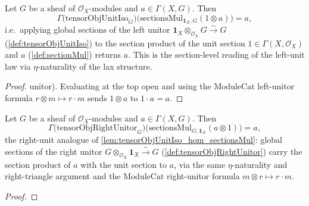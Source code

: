 \begin{lemma}\leanok
  \label{lem:tensorObjUnitIso_hom_sectionsMul}
  Let \(G\) be a sheaf of \(\mathcal{O}_X\)-modules and \(a \in \Gamma(X, G)\).
  Then
  \[
    \Gamma\bigl(\mathrm{tensorObjUnitIso}_G\bigr)
      \bigl(\mathrm{sectionsMul}_{\mathbf{1}_X, G}(1 \otimes a)\bigr) = a,
  \]
  i.e.\ applying global sections of the left unitor
  \(\mathbf{1}_X \otimes_{\mathcal{O}_X} G \xrightarrow{\sim} G\)
  (\cref{def:tensorObjUnitIso}) to the section product of the unit section
  \(1 \in \Gamma(X,\mathcal{O}_X)\) and \(a\) (\cref{def:sectionMul}) returns
  \(a\). This is the section-level reading of the left-unit law via
  \(\eta\)-naturality of the lax structure.
\end{lemma}

\begin{proof}
  \leanok
  unitor). Evaluating at the top open and using the \(\mathrm{ModuleCat}\)
  left-unitor formula \(r \otimes m \mapsto r \cdot m\) sends \(1 \otimes a\) to
  \(1 \cdot a = a\).
\end{proof}

\begin{lemma}\leanok
  \label{lem:tensorObjRightUnitor_hom_sectionsMul}
  Let \(G\) be a sheaf of \(\mathcal{O}_X\)-modules and \(a \in \Gamma(X, G)\).
  Then
  \[
    \Gamma\bigl(\mathrm{tensorObjRightUnitor}_G\bigr)
      \bigl(\mathrm{sectionsMul}_{G, \mathbf{1}_X}(a \otimes 1)\bigr) = a,
  \]
  the right-unit analogue of \cref{lem:tensorObjUnitIso_hom_sectionsMul}: global
  sections of the right unitor
  \(G \otimes_{\mathcal{O}_X} \mathbf{1}_X \xrightarrow{\sim} G\)
  (\cref{def:tensorObjRightUnitor}) carry the section product of \(a\) with the
  unit section to \(a\), via the same \(\eta\)-naturality and right-triangle
  argument and the \(\mathrm{ModuleCat}\) right-unitor formula
  \(m \otimes r \mapsto r \cdot m\).
\end{lemma}

\begin{proof}
  \leanok
\end{proof}

